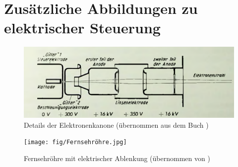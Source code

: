 \section{Zusätzliche Abbildungen zu elektrischer Steuerung}

\begin{figure}[h]
    \centering
    \includegraphics[width=.9\textwidth]{fig/Elektronenstrahl.PNG}
    \caption{Details der Elektronenkanone (übernommen aus dem Buch \cite{Fernsehroehre})}
    \label{fig:elS}
\end{figure}

\begin{figure}[h]
    \centering
    \texttt{[image: fig/Fernsehröhre.jpg]}
    \caption{Fernsehröhre mit elektrischer Ablenkung (übernommen von \cite{Abbildung}) }
    \label{fig:Fernsehroehre}
\end{figure}
